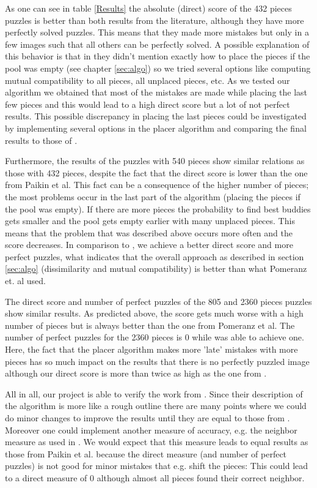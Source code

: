 \documentclass[11pt]{report}
\begin{document}
As one can see in table \ref{Results} the absolute (direct) score of the 432 pieces puzzles is better than both results from the literature, although they have more perfectly solved puzzles. This means that they made more mistakes but only in a few images such that all others can be perfectly solved. A possible explanation of this behavior is that in \cite{Paikin2015} they didn't mention exactly how to place the pieces if the pool was empty (see chapter \ref{sec:algo}) so we tried several options like computing mutual compatibility to all pieces, all unplaced pieces, etc. As we tested our algorithm we obtained that most of the mistakes are made while placing the last few pieces and this would lead to a high direct score but a lot of not perfect results. This possible discrepancy in placing the last pieces could be investigated by implementing several options in the placer algorithm and comparing the final results to those of \cite{Paikin2015}.

Furthermore, the results of the puzzles with 540 pieces show similar relations as those with 432 pieces, despite the fact that the direct score is lower than the one from Paikin et al. This fact can be a consequence of the higher number of pieces; the most problems occur in the last part of the algorithm (placing the pieces if the pool was empty). If there are more pieces the probability to find best buddies gets smaller and the pool gets empty earlier with many unplaced pieces. This means that the problem that was described above occurs more often and the score decreases. In comparison to \cite{Pomeranz2011}, we achieve a better direct score and more perfect puzzles, what indicates that the overall approach as described in section \ref{sec:algo} (dissimilarity and mutual compatibility) is better than what Pomeranz et. al used.

The direct score and number of perfect puzzles of the 805 and 2360 pieces puzzles show similar results. As predicted above, the score gets much worse with a high number of pieces but is always better than the one from Pomeranz et al. The number of perfect puzzles for the 2360 pieces is 0 while \cite{Pomeranz2011} was able to achieve one. Here, the fact that the placer algorithm makes more 'late' mistakes with more pieces has so much impact on the results that there is no perfectly puzzled image although our direct score is more than twice as high as the one from \cite{Pomeranz2011}.

All in all, our project is able to verify the work from \cite{Paikin2015}. Since their description of the algorithm is more like a rough outline there are many points where we could do minor changes to improve the results until they are equal to those from \cite{Paikin2015}. Moreover one could implement another measure of accuracy, e.g. the neighbor measure as used in \cite{Paikin2015}. We would expect that this measure leads to equal results as those from Paikin et al. because the direct measure (and number of perfect puzzles) is not good for minor mistakes that e.g. shift the pieces: This could lead to a direct measure of 0 although almost all pieces found their correct neighbor. 


\nocite{*}


\end{document}
